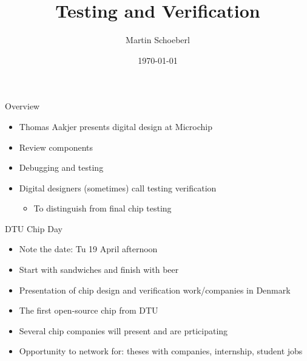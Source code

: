 

\newif\ifbook


\title{Testing and Verification}
\author{Martin Schoeberl}
\date{\today}



\begin{frame}
\titlepage
\end{frame}

\begin{frame}[fragile]{Overview}
\begin{itemize}
\item Thomas Aakjer presents digital design at Microchip
\item Review components
\item Debugging and testing
\item Digital designers (sometimes) call testing verification
\begin{itemize}
\item To distinguish from final chip testing
\end{itemize}
\end{itemize}
\end{frame}

\begin{frame}[fragile]{DTU Chip Day}
\begin{itemize}
\item Note the date: Tu 19 April afternoon
\item Start with sandwiches and finish with beer
\item Presentation of chip design and verification work/companies in Denmark
\item The first open-source chip from DTU
\item Several chip companies will present and are prticipating
\item Opportunity to network for: theses with companies, internship, student jobs
\end{itemize}
\end{frame}

